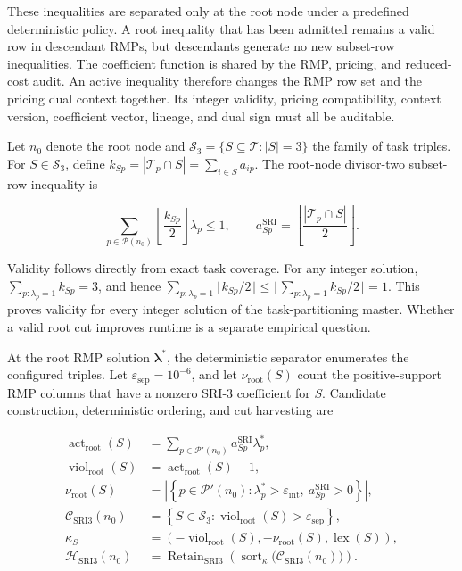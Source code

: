 \documentclass[
  11pt,
]{article}
\begin{document}
These inequalities are separated only at the root node under a
predefined deterministic policy. A root inequality that has been
admitted remains a valid row in descendant RMPs, but descendants
generate no new subset-row inequalities. The coefficient function is
shared by the RMP, pricing, and reduced-cost audit. An active inequality
therefore changes the RMP row set and the pricing dual context together.
Its integer validity, pricing compatibility, context version,
coefficient vector, lineage, and dual sign must all be auditable.

Let \(n_0\) denote the root node and
\(\mathcal{S}_3=\{S\subseteq\mathcal{T}:|S|=3\}\) the family of task
triples. For \(S\in\mathcal{S}_3\), define
\(k_{Sp}=|\mathcal{T}_p\cap S|=\sum_{i\in S}a_{ip}\). The root-node
divisor-two subset-row inequality is

\[
\sum_{p\in\mathcal{P}(n_0)}
\left\lfloor\frac{k_{Sp}}{2}\right\rfloor\lambda_p
\le 1,
\qquad
a_{Sp}^{\mathrm{SRI}}
=\left\lfloor\frac{|\mathcal{T}_p\cap S|}{2}\right\rfloor .
\tag{20}
\]

Validity follows directly from exact task coverage. For any integer
solution, \(\sum_{p:\lambda_p=1}k_{Sp}=3\), and hence
\(\sum_{p:\lambda_p=1}\lfloor k_{Sp}/2\rfloor \le\lfloor\sum_{p:\lambda_p=1}k_{Sp}/2\rfloor =1\).
This proves validity for every integer solution of the task-partitioning
master. Whether a valid root cut improves runtime is a separate
empirical question.

At the root RMP solution \(\boldsymbol{\lambda}^*\), the deterministic
separator enumerates the configured triples. Let
\(\varepsilon_{\mathrm{sep}}=10^{-6}\), and let
\(\nu_{\mathrm{root}}(S)\) count the positive-support RMP columns that
have a nonzero SRI-3 coefficient for \(S\). Candidate construction,
deterministic ordering, and cut harvesting are

\[
\begin{aligned}
\operatorname{act}_{\mathrm{root}}(S)
&=\sum_{p\in\mathcal{P}'(n_0)}
a_{Sp}^{\mathrm{SRI}}\lambda_p^*,\\
\operatorname{viol}_{\mathrm{root}}(S)
&=\operatorname{act}_{\mathrm{root}}(S)-1,\\
\nu_{\mathrm{root}}(S)
&=\left|
\left\{p\in\mathcal{P}'(n_0):
\lambda_p^*>\varepsilon_{\mathrm{int}},\
a_{Sp}^{\mathrm{SRI}}>0\right\}
\right|,\\
\mathcal{C}_{\mathrm{SRI3}}(n_0)
&=\left\{S\in\mathcal{S}_3:
\operatorname{viol}_{\mathrm{root}}(S)>
\varepsilon_{\mathrm{sep}}\right\},\\
\kappa_S
&=\left(
-\operatorname{viol}_{\mathrm{root}}(S),
-\nu_{\mathrm{root}}(S),
\operatorname{lex}(S)
\right),\\
\mathcal{H}_{\mathrm{SRI3}}(n_0)
&=\operatorname{Retain}_{\mathrm{SRI3}}\!\left(
\operatorname{sort}_{\kappa}
\bigl(\mathcal{C}_{\mathrm{SRI3}}(n_0)\bigr)
\right).
\end{aligned}
\tag{21}
\]
\end{document}
